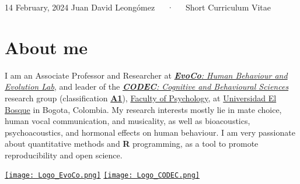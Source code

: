 \documentclass[11pt,a4paper,]{awesome-cv}
\begin{document}
\makecvheader

\makecvfooter
  {14 February, 2024}
    {Juan David Leongómez~~~·~~~Short Curriculum Vitae}
  {\thepage}





\hypertarget{about-me}{%
\section{About me}\label{about-me}}

\begin{minipage}[c]{0.9\linewidth}
I am an Associate Professor and Researcher at \href{https://jdleongomez.info/en/team/}{\textit{\textbf{EvoCo}: Human Behaviour and Evolution Lab}}, and leader of the \href{https://investigaciones.unbosque.edu.co/codec}{\textit{\textbf{CODEC}: Cognitive and Behavioural Sciences}} research group (classification \href{https://scienti.minciencias.gov.co/gruplac/jsp/visualiza/visualizagr.jsp?nro=00000000001446}{\textbf{A1}}), \href{https://www.uelbosque.edu.co/psicologia}{Faculty of Psychology}, at \href{https://www.uelbosque.edu.co/}{Universidad El Bosque} in Bogota, Colombia. My research interests mostly lie in mate choice, human vocal communication, and musicality, as well as bioacoustics, psychoacoustics, and hormonal effects on human behaviour. I am very passionate about quantitative methods and \textbf{R} programming, as a tool to promote reproducibility and open science.
\end{minipage} \begin{minipage}[c]{0.1\linewidth}
\begin{flushright} 
\hfill \href{https://jdleongomez.info/en/team/}{\texttt{[image: Logo\_EvoCo.png]}} \newline \href{https://investigaciones.unbosque.edu.co/codec}{\texttt{[image: Logo\_CODEC.png]}}
\end{flushright}
\end{minipage}
\end{document}
